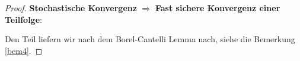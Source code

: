\begin{proof}
\textbf{Stochastische Konvergenz } $\Rightarrow$ \textbf{ Fast sichere Konvergenz einer Teilfolge}:

Den Teil liefern wir nach dem Borel-Cantelli Lemma nach, siehe die Bemerkung \ref{bem4}.
%
\end{proof}

